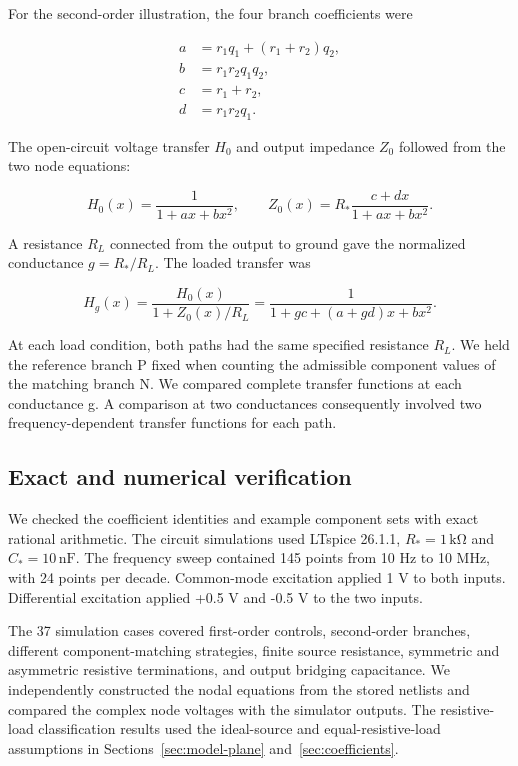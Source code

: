 For the second-order illustration, the four branch coefficients were

\begin{equation}\label{eq:4}
\begin{aligned}
a&=r_1q_1+(r_1+r_2)q_2,\\
b&=r_1r_2q_1q_2,\\
c&=r_1+r_2,\\
d&=r_1r_2q_1.
\end{aligned}
\end{equation}

The open-circuit voltage transfer \(H_0\) and output impedance \(Z_0\) followed from the two node equations:

\begin{equation}\label{eq:5}
H_0(x)=\frac{1}{1+ax+bx^2},\qquad
Z_0(x)=R_*\frac{c+dx}{1+ax+bx^2}.
\end{equation}

A resistance \(R_L\) connected from the output to ground gave the normalized conductance \(g=R_*/R_L\). The loaded transfer was

\begin{equation}\label{eq:6}
H_g(x)=\frac{H_0(x)}{1+Z_0(x)/R_L}
      =\frac{1}{1+gc+(a+gd)x+bx^2}.
\end{equation}

At each load condition, both paths had the same specified resistance \(R_L\). We held the reference branch P fixed when counting the admissible component values of the matching branch N. We compared complete transfer functions at each conductance g. A comparison at two conductances consequently involved two frequency-dependent transfer functions for each path.

\subsection{Exact and numerical verification}

We checked the coefficient identities and example component sets with exact rational arithmetic. The circuit simulations used LTspice 26.1.1, \(R_*=1\,\mathrm{k\Omega}\) and \(C_*=10\,\mathrm{nF}\). The frequency sweep contained 145 points from 10 Hz to 10 MHz, with 24 points per decade. Common-mode excitation applied 1 V to both inputs. Differential excitation applied +0.5 V and -0.5 V to the two inputs.

The 37 simulation cases covered first-order controls, second-order branches, different component-matching strategies, finite source resistance, symmetric and asymmetric resistive terminations, and output bridging capacitance. We independently constructed the nodal equations from the stored netlists and compared the complex node voltages with the simulator outputs. The resistive-load classification results used the ideal-source and equal-resistive-load assumptions in Sections~\ref{sec:model-plane} and~\ref{sec:coefficients}.


